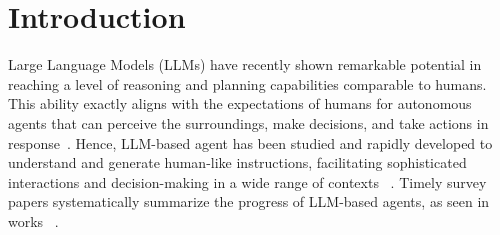 \section{Introduction}


Large Language Models (LLMs) have recently shown remarkable potential in reaching a level of reasoning and planning capabilities comparable to humans.
This ability exactly aligns with the expectations of humans for autonomous agents that can perceive the surroundings, make decisions, and take actions in response~\cite{xi2023rise,Wooldridge1995IntelligentAT,Artificial_Intelligence_AModernApproach,guo2023indeed,liang2023let}. Hence, LLM-based agent has been studied and rapidly developed to understand and generate human-like instructions, facilitating sophisticated interactions and decision-making in a wide range of contexts
~\cite{yao2023tree,shinn2023reflexion,li2023apibank}. Timely survey papers systematically summarize the progress of LLM-based agents, as seen in works ~\cite{xi2023rise,wang2023survey}.



